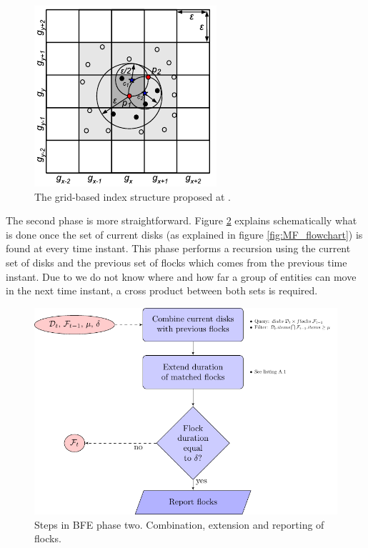 \begin{figure}
    \centering
    \includegraphics[clip,trim=13cm 21.9cm 4.1cm 1.9cm, width=0.5\linewidth]{figures/grid2}
    \caption{The grid-based index structure proposed at \cite{vieira_2009}.}\label{fig:grid}
\end{figure}

The second phase is more straightforward.  Figure \ref{fig:FF_flowchart} explains schematically what is done once the set of current disks (as explained in figure \ref{fig:MF_flowchart}) is found at every time instant.  This phase performs a recursion using the current set of disks and the previous set of flocks which comes from the  previous time instant.  Due to we do not know where and how far a group of entities can move in the next time instant, a cross product between both sets is required.  

\begin{figure}
    \centering
    \includegraphics[width=\linewidth]{figures/FF_flowchart}
    \caption{Steps in BFE phase two. Combination, extension and reporting of flocks.}\label{fig:FF_flowchart}
\end{figure}

